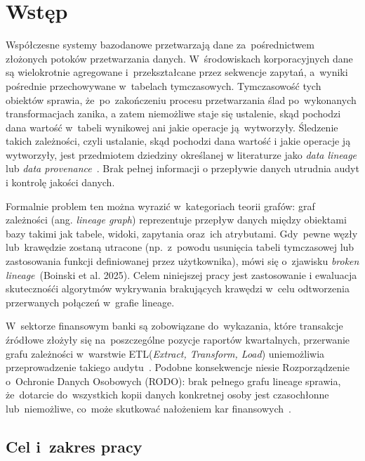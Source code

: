 \documentclass[polish,master,a4paper,oneside]{ppfcmthesis}
\begin{document}
\chapter{Wstęp}

Współczesne systemy bazodanowe przetwarzają dane za~pośrednictwem złożonych
potoków przetwarzania danych. W~środowiskach korporacyjnych dane są wielokrotnie
agregowane i~przekształcane przez sekwencje zapytań, a~wyniki pośrednie
przechowywane w~tabelach tymczasowych. Tymczasowość tych obiektów sprawia,
że~po~zakończeniu procesu przetwarzania ślad po~wykonanych transformacjach
zanika, a zatem niemożliwe staje się ustalenie, skąd pochodzi dana wartość
w~tabeli wynikowej ani jakie operacje ją~wytworzyły. Śledzenie takich zależności, 
czyli ustalanie, skąd pochodzi dana wartość i jakie operacje ją wytworzyły, 
jest przedmiotem dziedziny określanej w literaturze jako \emph{data lineage} 
lub \emph{data provenance}~\cite{Psallidas2022,Yamada2023}. 
Brak pełnej informacji o przepływie danych utrudnia audyt i kontrolę 
jakości danych.

Formalnie problem ten można wyrazić w~kategoriach teorii grafów: graf
zależności (ang. \emph{lineage graph}) reprezentuje przepływ danych między
obiektami bazy takimi jak tabele, widoki, zapytania oraz~ich atrybutami.
Gdy~pewne węzły lub~krawędzie zostaną utracone (np.~z~powodu usunięcia
tabeli tymczasowej lub zastosowania funkcji definiowanej przez użytkownika),
mówi się o~zjawisku \emph{broken lineage}~(Boinski et al. 2025)\cite{Boinski2025}. Celem
niniejszej pracy jest zastosowanie i ewaluacja skutecznośći algorytmów wykrywania brakujących krawędzi
w~celu odtworzenia przerwanych połączeń w~grafie lineage.

W~sektorze finansowym banki są zobowiązane do~wykazania, które transakcje
źródłowe złożyły się na~poszczególne pozycje raportów kwartalnych, przerwanie
grafu zależności w~warstwie ETL(\emph{Extract, Transform, Load}) uniemożliwia przeprowadzenie takiego audytu~\cite{Boinski2025}.
Podobne konsekwencje niesie Rozporządzenie o~Ochronie Danych Osobowych (RODO):
brak pełnego grafu lineage sprawia, że~dotarcie do~wszystkich kopii danych
konkretnej osoby jest czasochłonne lub~niemożliwe, co~może skutkować
nałożeniem kar finansowych~\cite{Boinski2025}.


\section{Cel i~zakres pracy}
\end{document}
